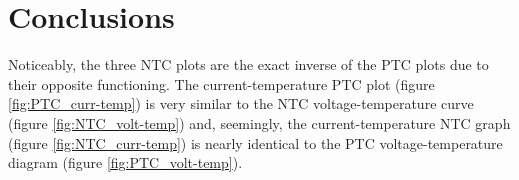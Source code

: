 \vspace{30px}\section{Conclusions}
Noticeably, the three NTC plots are the exact inverse of the PTC plots due to their opposite functioning. The current-temperature PTC plot (figure \ref{fig:PTC_curr-temp}) is very similar to the NTC voltage-temperature curve (figure \ref{fig:NTC_volt-temp}) and, seemingly, the current-temperature NTC graph (figure \ref{fig:NTC_curr-temp}) is nearly identical to the PTC voltage-temperature diagram (figure \ref{fig:PTC_volt-temp}).

